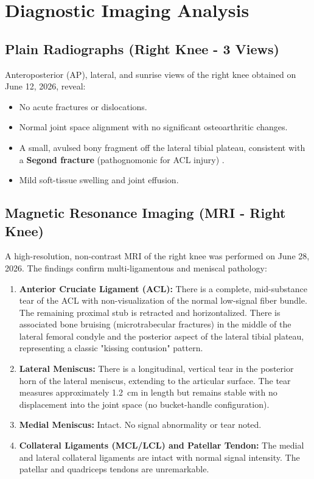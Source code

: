 \section{Diagnostic Imaging Analysis}
\label{sec:imaging}

\subsection{Plain Radiographs (Right Knee - 3 Views)}
Anteroposterior (AP), lateral, and sunrise views of the right knee obtained on June 12, 2026, reveal:
\begin{itemize}
  \item No acute fractures or dislocations.
  \item Normal joint space alignment with no significant osteoarthritic changes.
  \item A small, avulsed bony fragment off the lateral tibial plateau, consistent with a \textbf{Segond fracture} (pathognomonic for ACL injury) \cite{meridian2025segond}.
  \item Mild soft-tissue swelling and joint effusion.
\end{itemize}

\subsection{Magnetic Resonance Imaging (MRI - Right Knee)}
A high-resolution, non-contrast MRI of the right knee was performed on June 28, 2026. The findings confirm multi-ligamentous and meniscal pathology:
\begin{enumerate}
  \item \textbf{Anterior Cruciate Ligament (ACL):} There is a complete, mid-substance tear of the ACL with non-visualization of the normal low-signal fiber bundle. The remaining proximal stub is retracted and horizontalized. There is associated bone bruising (microtrabecular fractures) in the middle of the lateral femoral condyle and the posterior aspect of the lateral tibial plateau, representing a classic "kissing contusion" pattern.
  \item \textbf{Lateral Meniscus:} There is a longitudinal, vertical tear in the posterior horn of the lateral meniscus, extending to the articular surface. The tear measures approximately 1.2~cm in length but remains stable with no displacement into the joint space (no bucket-handle configuration).
  \item \textbf{Medial Meniscus:} Intact. No signal abnormality or tear noted.
  \item \textbf{Collateral Ligaments (MCL/LCL) and Patellar Tendon:} The medial and lateral collateral ligaments are intact with normal signal intensity. The patellar and quadriceps tendons are unremarkable.
\end{enumerate}

